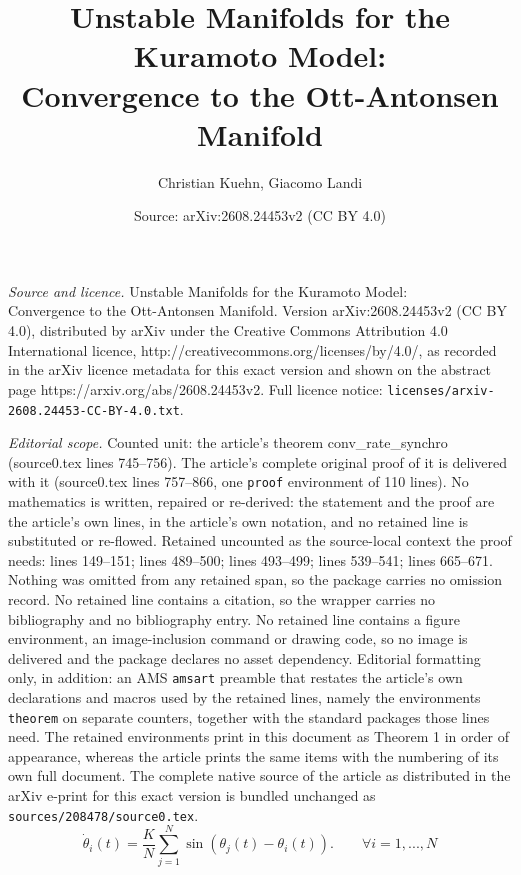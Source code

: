 \documentclass[10pt,a4paper]{amsart}
\title{Unstable Manifolds for the Kuramoto Model:\\ Convergence to the Ott-Antonsen Manifold}
\author{Christian Kuehn, Giacomo Landi\samethanks}
\date{Source: arXiv:2608.24453v2 (CC BY 4.0)}
\begin{document}
\maketitle

\noindent\emph{Source and licence.} Unstable Manifolds for the Kuramoto Model:\\ Convergence to the Ott-Antonsen Manifold. Version arXiv:2608.24453v2 (CC BY 4.0), distributed by arXiv under the Creative Commons Attribution 4.0 International licence, http://creativecommons.org/licenses/by/4.0/, as recorded in the arXiv licence metadata for this exact version and shown on the abstract page https://arxiv.org/abs/2608.24453v2. Full licence notice: \texttt{licenses/arxiv-2608.24453-CC-BY-4.0.txt}.\par\smallskip

\noindent\textit{Editorial scope.} Counted unit: the article's theorem conv\_rate\_synchro (source0.tex lines 745--756). The article's complete original proof of it is delivered with it (source0.tex lines 757--866, one \texttt{proof} environment of 110 lines). No mathematics is written, repaired or re-derived: the statement and the proof are the article's own lines, in the article's own notation, and no retained line is substituted or re-flowed.  Retained uncounted as the source-local context the proof needs: lines 149--151; lines 489--500; lines 493--499; lines 539--541; lines 665--671.  Nothing was omitted from any retained span, so the package carries no omission record.  No retained line contains a citation, so the wrapper carries no bibliography and no bibliography entry.  No retained line contains a figure environment, an image-inclusion command or drawing code, so no image is delivered and the package declares no asset dependency.  Editorial formatting only, in addition: an AMS \texttt{amsart} preamble that restates the article's own declarations and macros used by the retained lines, namely the environments \texttt{theorem} on separate counters, together with the standard packages those lines need.  The retained environments print in this document as Theorem 1 in order of appearance, whereas the article prints the same items with the numbering of its own full document.  The complete native source of the article as distributed in the arXiv e-print for this exact version is bundled unchanged as \texttt{sources/208478/source0.tex}.
\begin{equation}\label{KMH}
    \dot{\theta}_i(t)=\frac{K}{N}\sum_{j=1}^N\sin{(\theta_j(t)-\theta_i(t))}.\qquad\forall i=1,...,N\tag{KMH}
\end{equation}
\end{document}
